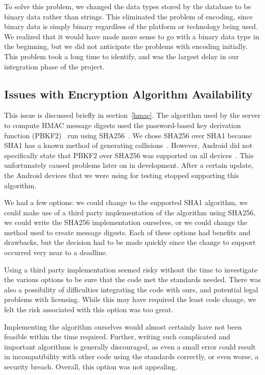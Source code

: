 \documentclass[12pt]{report}
\let\Oldsubsection\subsection
\renewcommand{\subsection}{\FloatBarrier\Oldsubsection}
\begin{document}
To solve this problem, we changed the data types stored by the database to be binary data
rather than strings. This eliminated the problem of encoding, since binary data is simply binary
regardless of the platform or technology being used. We realized that it would have made more
sense to go with a binary data type in the beginning, but we did not anticipate the problems with
encoding initially. This problem took a long time to identify, and was the largest delay in our
integration phase of the project.

\subsection{Issues with Encryption Algorithm Availability} \label{issues-with-encryption-algorithm-availability}

This issue is discussed briefly in section~\ref{hmac}. The algorithm used by the server to compute HMAC message digests
used the password-based key derivation function (PBKF2)~\autocite{RFC6070} run using SHA256~\autocite{RFC4634}. We chose
SHA256 over SHA1 because SHA1 has a known method of generating collisions~\autocite{SHA1COLLISION}. However, Android
did not specifically state that PBKF2 over SHA256 was supported on all devices~\autocite{ANDROIDKEYFACTORY}. This
unfortunately caused problems later on in development. After a certain update, the Android devices that we were using
for testing stopped supporting this algorithm.

We had a few options: we could change to the supported SHA1 algorithm, we could make use of a third party implementation
of the algorithm using SHA256, we could write the SHA256 implementation ourselves, or we could change the method used to
create message digests. Each of these options had benefits and drawbacks, but the decision had to be made quickly since
the change to support occurred very near to a deadline.

Using a third party implementation seemed risky without the time to investigate the various options to be sure that the
code met the standards needed. There was also a possibility of difficulties integrating the code with ours, and
potential legal problems with licensing. While this may have required the least code change, we felt the risk
associated with this option was too great.

Implementing the algorithm ourselves would almost certainly have not been feasible within the time required. Further,
writing such complicated and important algorithms is generally discouraged, as even a small error could result in
incompatibility with other code using the standards correctly, or even worse, a security breach. Overall, this option
was not appealing.
\end{document}
